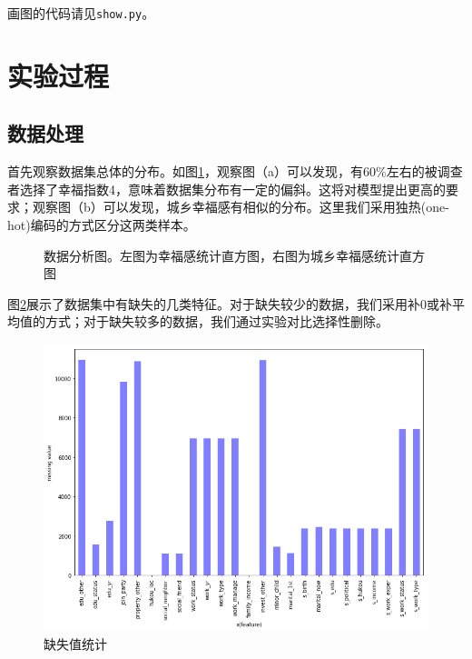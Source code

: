 \documentclass[logo,reportComp]{thesis}
\begin{document}
画图的代码请见\verb'show.py'。

\section{实验过程}
\subsection{数据处理}

首先观察数据集总体的分布。如图\ref{fig:happy&urbanrural}，观察图（a）可以发现，有60\%左右的被调查者选择了幸福指数4，意味着数据集分布有一定的偏斜。这将对模型提出更高的要求；观察图（b）可以发现，城乡幸福感有相似的分布。这里我们采用独热(one-hot)编码的方式区分这两类样本。
\begin{figure}[H]
	\centering
	\quad
	\caption{数据分析图。左图为幸福感统计直方图，右图为城乡幸福感统计直方图}
	\label{fig:happy&urbanrural}
\end{figure}

图\ref{fig:missing}展示了数据集中有缺失的几类特征。对于缺失较少的数据，我们采用补0或补平均值的方式；对于缺失较多的数据，我们通过实验对比选择性删除。
\begin{figure}[H]
\centering
\includegraphics[width=0.7\linewidth]{fig/missing.png}
\caption{缺失值统计}
\label{fig:missing}
\end{figure}
\end{document}
